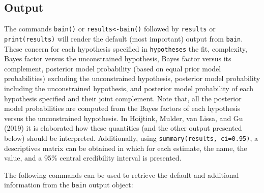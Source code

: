 \documentclass[
]{book}
\begin{document}
\hypertarget{output}{%
\subsection{Output}\label{output}}

The commands \texttt{bain()} or \texttt{results\textless{}-bain()} followed by
\texttt{results} or \texttt{print(results)} will render the default (most
important) output from \texttt{bain}. These concern for each hypothesis
specified in \texttt{hypotheses} the fit, complexity, Bayes factor versus
the unconstrained hypothesis, Bayes factor versus its
complement, posterior model probability (based on equal prior model
probabilities) excluding the unconstrained hypothesis, posterior model
probability including the unconstrained hypothesis, and posterior model
probability of each hypothesis specified and their joint complement.
Note that, all the posterior model probabilities are computed from
the Bayes factors of each hypothesis versus the unconstrained hypothesis.
In Hoijtink, Mulder,
van Lissa, and Gu (2019) it is elaborated how these quantities
(and the other
output presented below) should be interpreted. Additionally, using
\texttt{summary(results,\ ci=0.95)}, a descriptives matrix can be obtained
in which for each estimate, the name, the value, and a 95\% central
credibility interval is presented.

The following commands can be used to
retrieve the default and additional information from the \texttt{bain} output
object:
\end{document}
